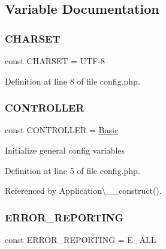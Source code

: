 \subsection{Variable Documentation}
\hypertarget{config_8php_a4ca86066304d2cbb779bd8afd1efe17b}{}\label{config_8php_a4ca86066304d2cbb779bd8afd1efe17b} 
\subsubsection{\texorpdfstring{C\+H\+A\+R\+S\+ET}{CHARSET}}
{\footnotesize\ttfamily const C\+H\+A\+R\+S\+ET = \textquotesingle{}U\+TF-\/8\textquotesingle{}}



Definition at line 8 of file config.\+php.

\hypertarget{config_8php_afa55a6839ec4ad32fc00879d78229356}{}\label{config_8php_afa55a6839ec4ad32fc00879d78229356} 
\subsubsection{\texorpdfstring{C\+O\+N\+T\+R\+O\+L\+L\+ER}{CONTROLLER}}
{\footnotesize\ttfamily const C\+O\+N\+T\+R\+O\+L\+L\+ER = \textquotesingle{}\hyperlink{class_basic}{Basic}\textquotesingle{}}

Initialize general config variables 

Definition at line 5 of file config.\+php.



Referenced by Application\textbackslash{}\+\_\+\+\_\+construct().

\hypertarget{config_8php_a80c2f40a4ce1ad3cbfb1978239f63c31}{}\label{config_8php_a80c2f40a4ce1ad3cbfb1978239f63c31} 
\subsubsection{\texorpdfstring{E\+R\+R\+O\+R\+\_\+\+R\+E\+P\+O\+R\+T\+I\+NG}{ERROR\_REPORTING}}
{\footnotesize\ttfamily const E\+R\+R\+O\+R\+\_\+\+R\+E\+P\+O\+R\+T\+I\+NG = E\+\_\+\+A\+LL}



